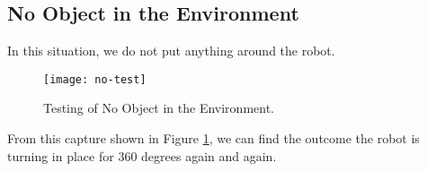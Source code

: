 \subsection{No Object in the Environment}
In this situation, we do not put anything around the robot.

\begin{figure}
\centering
\texttt{[image: no-test]}
\caption{Testing of No Object in the Environment.}
\label{fig:no-test}
\end{figure}
 
From this capture shown in Figure \ref{fig:no-test}, we can find the outcome the robot is turning in place for 360 degrees again and again.
